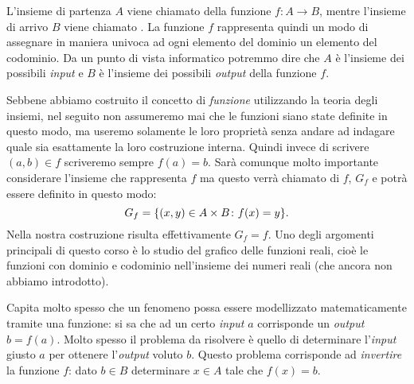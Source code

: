 L'insieme di partenza $A$ viene chiamato  
della funzione $f\colon A\to B$,
mentre l'insieme di arrivo $B$ viene chiamato .
La funzione $f$ rappresenta quindi un modo di assegnare in maniera univoca
ad ogni elemento del dominio un elemento del codominio.
Da un punto di vista informatico potremmo dire che $A$ è l'insieme
dei possibili \emph{input} e $B$ è l'insieme dei possibili \emph{output}
della funzione $f$.

Sebbene abbiamo costruito il concetto di \emph{funzione} utilizzando la teoria
degli insiemi, nel seguito non assumeremo mai che le funzioni siano state definite
in questo modo, ma useremo solamente le loro proprietà senza andare ad indagare
quale sia esattamente la loro costruzione interna.
Quindi invece di scrivere $(a,b)\in f$ scriveremo sempre $f(a)=b$.
Sarà comunque molto importante
considerare l'insieme che rappresenta $f$ ma questo verrà chiamato
 di $f$, $G_f$ e potrà essere definito in questo modo:
\[
  G_f = {\left\{ (x,y)\in A \times B\colon f(x)=y \right\}}.
\]
Nella nostra costruzione risulta effettivamente $G_f = f$.
Uno degli argomenti principali di questo corso è lo studio 
del grafico delle funzioni reali, cioè le funzioni 
con dominio e codominio nell'insieme dei numeri reali (che ancora 
non abbiamo introdotto).

Capita molto spesso che un fenomeno possa essere modellizzato matematicamente
tramite una funzione: si sa che ad un certo \emph{input} $a$ corrisponde
un \emph{output} $b=f(a)$. Molto spesso il problema da risolvere è
quello di determinare l'\emph{input} giusto $a$ per ottenere l'\emph{output}
voluto $b$. Questo problema corrisponde ad \emph{invertire} la funzione $f$:
dato $b\in B$ determinare $x\in A$ tale che $f(x) = b$.

